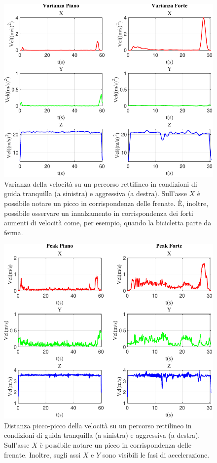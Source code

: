\documentclass[class=article]{standalone}
\begin{document}
	\begin{center}
		\begin{figure}[h!]
			\centering\includegraphics[width=.7\textwidth]{img/lungaFP/Vel/Varianza}
			\caption[]{Varianza della velocità su un percorso rettilineo in condizioni di guida tranquilla (a sinistra) e aggressiva (a destra). Sull'asse \(X\) è possibile notare un picco in corrispondenza delle frenate. È, inoltre, possibile osservare un innalzamento in corrispondenza dei forti aumenti di velocità come, per esempio, quando la bicicletta parte da ferma.}
			\label{fig:VelVar_lungaFP}
		\end{figure}
	\end{center}
	
	\begin{center}
		\begin{figure}[h!]
			\centering\includegraphics[width=.7\textwidth]{img/lungaFP/Vel/Peak}
			\caption[]{Distanza picco-picco della velocità su un percorso rettilineo in condizioni di guida tranquilla (a sinistra) e aggressiva (a destra). Sull'asse \(X\) è possibile notare un picco in corrispondenza delle frenate. Inoltre, sugli assi \(X\) e \(Y\) sono visibili le fasi di accelerazione.}
			\label{fig:VelPeak_lungaFP}
		\end{figure}
	\end{center}
	
\end{document}

